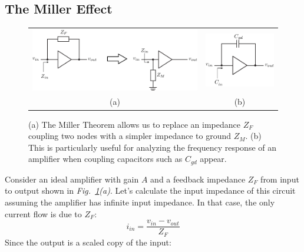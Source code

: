 \subsection{The Miller Effect}
\begin{figure}[tb]
\centering
\begin{tabular}{cc}
\includegraphics[scale=.9]{miller2} &
\includegraphics[scale=.9]{miller_cap}\\
(a) & (b)\\
\end{tabular}
\caption{(a) The Miller Theorem allows us to replace an impedance $Z_F$ coupling two nodes with a simpler impedance to ground $Z_M$.  (b) This is particularly useful for analyzing the frequency response of an amplifier when coupling capacitors such as $C_{gd}$ appear.}
\label{fig:miller1}
\end{figure}
Consider an ideal amplifier with gain $A$ and a feedback impedance $Z_F$ from input to output shown in \emph{Fig.~\ref{fig:miller1}(a)}.  Let's calculate the input impedance of this circuit assuming the amplifier has infinite input impedance.  In that case, the only current flow is due to $Z_F$:
    \begin{equation}
        i_{in} = \frac{v_{in} - v_{out}}{Z_F}
    \end{equation}
Since the output is a scaled copy of the input:
